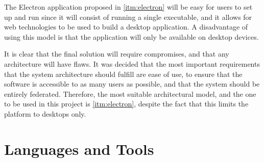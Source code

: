 The Electron application proposed in \ref{itm:electron} will be easy for users to set up and run since it will consist of running a single executable, and it allows for web technologies to be used to build a desktop application. A disadvantage of using this model is that the application will only be available on desktop devices.

It is clear that the final solution will require compromises, and that any architecture will have flaws. It was decided that the most important requirements that the system architecture should fulfill are ease of use, to ensure that the software is accessible to as many users as possible, and that the system should be entirely federated. Therefore, the most suitable architectural model, and the one to be used in this project is \ref{itm:electron}, despite the fact that this limits the platform to desktops only.

\section{Languages and Tools}